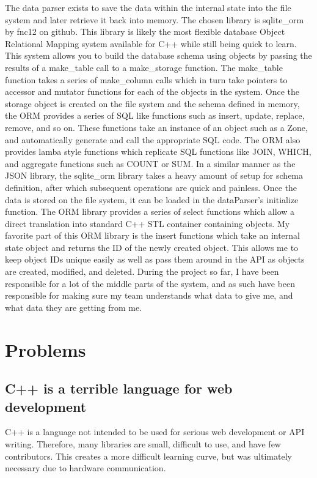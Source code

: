 \documentclass[onecolumn, draftclsnofoot,10pt, compsoc]{IEEEtran}
\begin{document}
	\noindent The data parser exists to save the data within the internal state into the file system and later retrieve it back into memory.
	The chosen library is sqlite\_orm by fnc12 on github.
	This library is likely the most flexible database Object Relational Mapping system available for C++ while still being quick to learn.
	This system allows you to build the database schema using objects by passing the results of a make\_table call to a make\_storage function.
	The make\_table function takes a series of make\_column calls which in turn take pointers to accessor and mutator functions for each of the objects in the system.
	Once the storage object is created on the file system and the schema defined in memory, the ORM provides a series of SQL like functions such as insert, update, replace, remove, and so on.
	These functions take an instance of an object such as a Zone, and automatically generate and call the appropriate SQL code.
	The ORM also provides lamba style functions which replicate SQL functions like JOIN, WHICH, and aggregate functions such as COUNT or SUM.
	In a similar manner as the JSON library, the sqlite\_orm library takes a heavy amount of setup for schema definition, after which subsequent operations are quick and painless.
	Once the data is stored on the file system, it can be loaded in the dataParser’s initialize function.
	The ORM library provides a series of select functions which allow a direct translation into standard C++ STL container containing objects.
	My favorite part of this ORM library is the insert functions which take an internal state object and returns the ID of the newly created object.
	This allows me to keep object IDs unique easily as well as pass them around in the API as objects are created, modified, and deleted.
	During the project so far, I have been responsible for a lot of the middle parts of the system, and as such have been responsible for making sure my team understands what data to give me, and what data they are getting from me.



	\section{Problems}
		\subsection{C++ is a terrible language for web development}
			C++ is a language not intended to be used for serious web development or API writing.
			Therefore, many libraries are small, difficult to use, and have few contributors.
			This creates a more difficult learning curve, but was ultimately necessary due to hardware communication.
\end{document}
